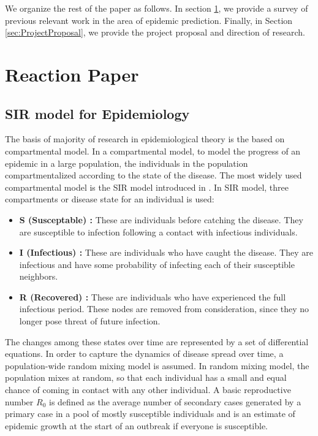 \documentclass[12pt, journal,onecolumn]{IEEEtran}
\begin{document}
We organize the rest of the paper as follows. In section \ref{sec:ReactionPaper}, we provide a survey of previous relevant work in the area of epidemic prediction.
Finally, in Section \ref{sec:ProjectProposal}, we provide the project proposal and direction of research.

\section{Reaction Paper}
\label{sec:ReactionPaper}
\subsection{\textbf{SIR model for Epidemiology  \citep{very_old_paper}}}
\label{SubSec:SIR}
The basis of majority of research in epidemiological theory is the based on compartmental model. In a compartmental model, to model the progress of an epidemic in a large population, the individuals in the population compartmentalized according to the state of the disease. The most widely used compartmental model is the SIR model introduced in \citep{very_old_paper}. In SIR model, three compartments or disease state for an individual is used:

\begin{itemize}
\item \textbf{S (Susceptable) : } These are individuals before catching the disease. They are susceptible to infection following a contact with infectious individuals.
\item \textbf{I (Infectious) : }These are individuals who have caught the disease. They are infectious and have some probability of infecting each of their susceptible neighbors.
\item \textbf{R (Recovered) : }These are individuals who have experienced the full infectious period. These nodes are removed from consideration, since they no longer pose threat of future infection.
\end{itemize}

The changes among these states over time are represented by a set of differential equations. In order to capture the dynamics of disease spread over time, a population-wide random mixing model is assumed. In random mixing model, the population mixes at random, so that each individual has a small and equal chance of coming in contact with any other individual. A basic reproductive number $R_0$ is defined as the average number of secondary cases generated by a primary case in a pool of mostly susceptible individuals and is an estimate of epidemic growth at the start of an outbreak if everyone is susceptible.
\end{document}
